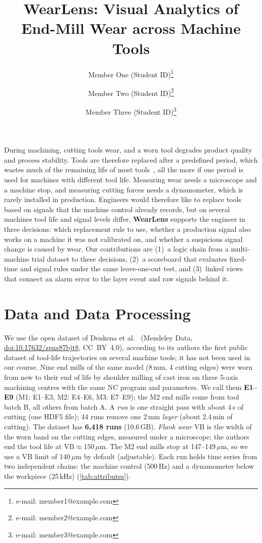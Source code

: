 \documentclass{vgtc}                          %
\title{WearLens: Visual Analytics of End-Mill Wear across Machine Tools}
\author{Member One (Student ID)\thanks{e-mail: member1@example.com}%
\and Member Two (Student ID)\thanks{e-mail: member2@example.com}%
\and Member Three (Student ID)\thanks{e-mail: member3@example.com}}
\affiliation{\scriptsize Team XX, National Taiwan Normal University} %
\begin{document}
\maketitle

During machining, cutting tools wear, and a worn tool degrades product quality and process stability. Tools are
therefore replaced after a predefined period, which wastes much of the remaining life of most tools~\cite{denkena2023},
all the more if one period is used for machines with different tool life. Measuring wear needs a microscope and a
machine stop, and measuring cutting forces needs a dynamometer, which is rarely installed in production. Engineers would
therefore like to replace tools based on signals that the machine control already records, but on several machines tool
life and signal levels differ. \textbf{WearLens} supports the engineer in three decisions: which replacement rule to use,
whether a production signal also works on a machine it was not calibrated on, and whether a suspicious signal change is
caused by wear. Our contributions are (1)~a logic chain from a multi-machine trial dataset to these decisions,
(2)~a scoreboard that evaluates fixed-time and signal rules under the same leave-one-out test, and (3)~linked views that
connect an alarm error to the layer event and raw signals behind it.

\section{Data and Data Processing}
\label{sec:data}
We use the open dataset of Denkena et al.~\cite{denkena2023} (Mendeley Data,
\href{https://doi.org/10.17632/zpxs87bjt8}{doi:10.17632/zpxs87bjt8}, CC~BY~4.0), according to its authors the first
public dataset of tool-life trajectories on several machine tools; it has not been used in our course. Nine end mills of
the same model (8\,mm, 4 cutting edges) were worn from new to their end of life by shoulder milling of cast iron on three
5-axis machining centres with the same NC program and parameters. We call them \textbf{E1--E9} (M1: E1--E3, M2: E4--E6,
M3: E7--E9); the M2 end mills come from tool batch B, all others from batch A. A \emph{run} is one straight pass with
about 4\,s of cutting (one HDF5 file); 44 runs remove one 2\,mm \emph{layer} (about 2.4\,min of cutting). The dataset has
\textbf{6,418 runs} (10.6\,GB). \emph{Flank wear} VB is the width of the worn band on the cutting edges, measured under a
microscope; the authors end the tool life at $\mathrm{VB}\approx150\,\mu$m. The M2 end mills stop at 147--149\,$\mu$m, so
we use a VB limit of 140\,$\mu$m by default (adjustable). Each run holds time series from two independent chains: the
machine control (500\,Hz) and a dynamometer below the workpiece (25\,kHz) (\cref{tab:attributes}).
\end{document}
